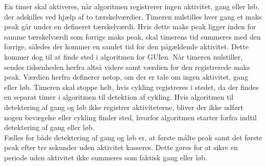 En timer skal aktiveres, når algoritmen registrerer ingen aktivitet, gang eller løb, der adskilles ved hjælp af to tærskelværdier. Timeren nulstilles hver gang et maks peak går under en defineret tærskelværdi. Hvis dette maks peak ligger inden for samme tærskelværdi som forrige maks peak, skal timerens tid summeres med den forrige, således der kommer en samlet tid for den pågældende aktivitet. Dette kommer dog til at finde sted i algoritmen for GUIen. Når timeren nulstiller, sendes tidsenheden herfra altså videre samt værdien for den registrerede maks peak. Værdien herfra definerer netop, om der er tale om ingen aktivitet, gang eller løb. Timeren skal stoppe helt, hvis cykling registreres i stedet, da der findes en separat timer i algoritmen til detektion af cykling. %
Hvis algoritmen til detektering af gang og løb ikke registrer aktiviteterne, bliver der ikke udført nogen bevægelse eller cykling finder sted, hvorfor algoritmen starter forfra indtil detektering af gang eller løb. \\
Fælles for både detektering af gang og løb er, at første målte peak samt det første peak efter tre sekunder uden aktivitet kasseres. Dette gøres for at sikre en periode uden aktivitet ikke summeres som faktisk gang eller løb.


